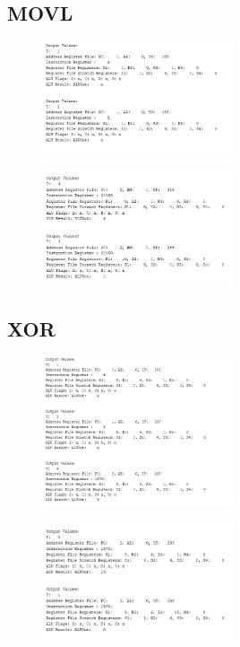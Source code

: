 \documentclass[pdftex,12pt,a4paper]{article}
\begin{document}
\subsection{MOVL}
\begin{figure}[H]
	\centering
	\includegraphics[width=0.5\textwidth]{movl1.png}	
	\label{fig11}
\end{figure}
\begin{figure}[H]
	\centering
	\includegraphics[width=0.5\textwidth]{movl2.png}	
	\label{fig12}
\end{figure}

\subsection{XOR}
\begin{figure}[H]
	\centering
	\includegraphics[width=0.5\textwidth]{xor1.png}	
	\label{fig13}
\end{figure}
\begin{figure}[H]
	\centering
	\includegraphics[width=0.5\textwidth]{xor2.png}	
	\label{fig14}
\end{figure}
\end{document}
